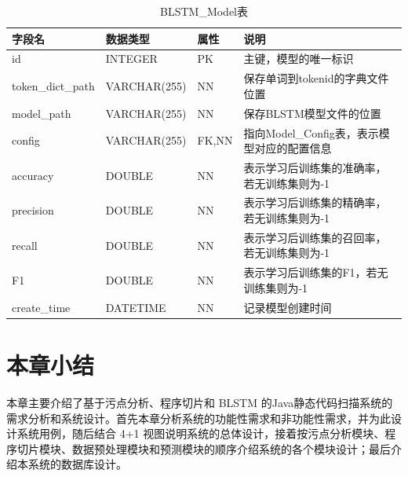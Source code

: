 \begin{table}[htb]\footnotesize %
	\centering
	\caption{BLSTM\_Model表}
	\vspace{2mm}
	\begin{tabular}{llll}
		\toprule
		\textbf{字段名}&\textbf{数据类型}&\textbf{属性}&\textbf{说明}\\
		\midrule
		id&INTEGER&PK&主键，模型的唯一标识\\
		token\_dict\_path &VARCHAR(255)&NN&保存单词到tokenid的字典文件位置\\
		model\_path		 &VARCHAR(255)&NN&保存BLSTM模型文件的位置\\
		config				 &VARCHAR(255)&FK,NN&指向Model\_Config表，表示模型对应的配置信息\\
		accuracy	&DOUBLE&NN&表示学习后训练集的准确率，若无训练集则为-1\\
		precision	&DOUBLE&NN&表示学习后训练集的精确率，若无训练集则为-1\\
		recall	&DOUBLE&NN&表示学习后训练集的召回率，若无训练集则为-1\\
		F1	&DOUBLE&NN&表示学习后训练集的F1，若无训练集则为-1\\
		create\_time		  &DATETIME&NN&记录模型创建时间\\
		\bottomrule
	\end{tabular}
	\label{sql:lstmModelTable}
\end{table}

\section{本章小结}

本章主要介绍了基于污点分析、程序切片和 BLSTM 的Java静态代码扫描系统的需求分析和系统设计。首先本章分析系统的功能性需求和非功能性需求，并为此设计系统用例，随后结合 4+1 视图说明系统的总体设计，接着按污点分析模块、程序切片模块、数据预处理模块和预测模块的顺序介绍系统的各个模块设计；最后介绍本系统的数据库设计。

